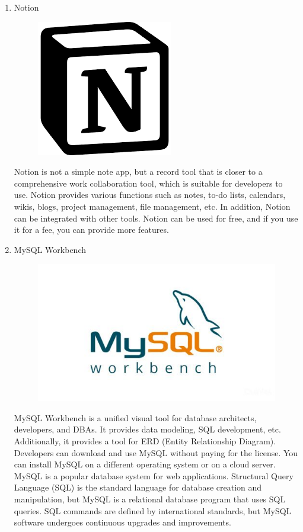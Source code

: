 \documentclass[conference]{IEEEtran}
\begin{document}
\begin{enumerate}
\begin{enumerate}
        \item Notion
        \begin{figure}[H]
                 \centering
                 \includegraphics[scale=0.25]{new_assets/notion-logo.png}
                 \end{figure}
        Notion is not a simple note app, but a record tool that is closer to a comprehensive work collaboration tool, which is suitable for developers to use. Notion provides various functions such as notes, to-do lists, calendars, wikis, blogs, project management, file management, etc. In addition, Notion can be integrated with other tools. Notion can be used for free, and if you use it for a fee, you can provide more features.\\
        \item MySQL Workbench
        \begin{figure}[H]
                 \centering
                 \includegraphics[scale=0.25]{new_assets/mysqlWB-logo.jpg}
                 \end{figure}
        MySQL Workbench is a unified visual tool for database architects, developers, and DBAs. It provides data modeling, SQL development, etc. Additionally, it provides a tool for ERD (Entity Relationship Diagram). Developers can download and use MySQL without paying for the license. You can install MySQL on a different operating system or on a cloud server. MySQL is a popular database system for web applications. Structural Query Language (SQL) is the standard language for database creation and manipulation, but MySQL is a relational database program that uses SQL queries. SQL commands are defined by international standards, but MySQL software undergoes continuous upgrades and improvements.\\

\end{enumerate}
\end{enumerate}
\end{document}
